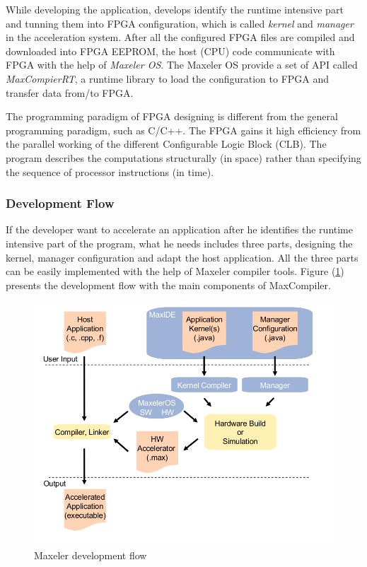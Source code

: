 While developing the application, develops identify the runtime intensive part
and tunning them into FPGA configuration, which is called \emph{kernel} and
\emph{manager} in the acceleration system. After all the configured FPGA
files are compiled and downloaded into FPGA EEPROM, the host (CPU) code
communicate with FPGA with the help of \emph{Maxeler OS}. The Maxeler OS
provide a set of API called \emph{MaxCompierRT}, a runtime library to load
the configuration to FPGA and transfer data from/to FPGA.

The programming paradigm of FPGA designing is different from the general
programming paradigm, such as C/C++. The FPGA gains it high efficiency from
the parallel working of the different Configurable Logic Block (CLB). The
program describes the computations structurally (in space) rather than
specifying the sequence of processor instructions (in
time)\cite{max_white_paper}.

\subsubsection{Development Flow}
If the developer want to accelerate an application after he identifies the
runtime intensive part of the program, what he needs includes three parts,
designing the kernel, manager configuration and adapt the host application.
All the three parts can be easily implemented with the help of Maxeler
compiler tools. Figure (\ref{fig:development_flow}) presents the development flow with the main
components of MaxCompiler.

\begin{figure}[h]
  \centering
  \includegraphics[scale=0.4]{img/development_flow.png}
  \caption{Maxeler development flow}
  \label{fig:development_flow}
\end{figure}

